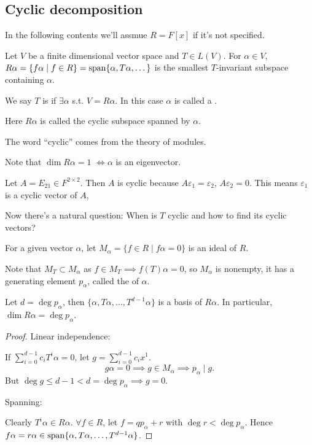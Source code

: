 \subsection{Cyclic decomposition}
\label{sub:Cyclic decomposition}
In the following contents we'll assmue $R = F[x]$ if it's
not specified.

\begin{definition}
	Let $V$ be a finite dimensional vector space and $T\in L(V)$.
	For $\alpha\in V$, $R\alpha = \{f\alpha \mid f\in R\}=
	\operatorname{span}\{\alpha, T\alpha, \dots\}$ is the smallest $T$-invariant subspace
	containing $\alpha$.

	We say $T$ is  if $\exists \alpha$ s.t. $V = R\alpha$.
	In this case $\alpha$ is called a .

	Here $R\alpha$ is called the cyclic subspace spanned by $\alpha$.
\end{definition}
\begin{remark}
    The word ``cyclic'' comes from the theory of modules.
\end{remark}

Note that $\dim R\alpha = 1$ $\iff \alpha$ is an eigenvector.

\begin{example}
    Let $A = E_{21} \in F^{2\times 2}$.
	Then $A$ is cyclic because $A\varepsilon_1 = \varepsilon_2$,
	$A\varepsilon_2 = 0$. This means $\varepsilon_1$ is a cyclic vector of $A$,
\end{example}

Now there's a natural question: When is $T$ cyclic and how to find its
cyclic vectors?

For a given vector $\alpha$, let $M_\alpha = \{f\in R\mid f\alpha = 0\}$ is
an ideal of $R$.

Note that $M_T \subset M_\alpha$ as $f\in M_T \implies f(T)\alpha = 0$,
so $M_\alpha$ is nonempty, it has a generating element $p_\alpha$,
called the  of $\alpha$.

\begin{proposition}
	Let $d = \deg p_\alpha$, then $\{\alpha, T\alpha, \dots, T^{d-1}\alpha\}$ is
	a basis of $R\alpha$.
	In particular, $\dim R\alpha = \deg p_\alpha$.
\end{proposition}
\begin{proof}[Proof]
    Linear independence:

	If $\sum_{i=0}^{d - 1} c_iT^i\alpha = 0$, let $g = \sum_{i=0}^{d - 1} c_ix^1$.
	\[
	g\alpha = 0 \implies g \in M_\alpha \implies p_\alpha \mid g.
	\]
	But $\deg g \le d - 1 < d = \deg p_\alpha \implies g = 0$.

	Spanning:

	Clearly $T^i \alpha \in R\alpha$. $\forall f\in R$,
	let $f = qp_\alpha + r$ with $\deg r < \deg p_\alpha$.
	Hence $f\alpha = r\alpha \in \operatorname{span}\{\alpha, T\alpha, \dots, T^{d - 1}\alpha\}$.
\end{proof}

